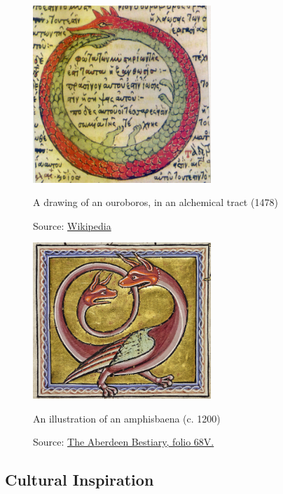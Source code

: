 \begin{uomappendix}
                \begin{figure}[h]
                    \centering
                    \includegraphics[width=0.6\textwidth]{images/Ouroborus.jpg}
                    \caption{A drawing of an ouroboros, in an alchemical tract (1478)}
                    \label{fig:ouroboros}
                    \caption*{Source: \href{https://en.wikipedia.org/wiki/File:Serpiente_alquimica.jpg}{Wikipedia}}
                \end{figure}
    
                \begin{figure}[H]
                    \centering
                    \includegraphics[width=0.6\textwidth]{images/Amphisbaena.png}
                    \caption{An illustration of an amphisbaena (c. 1200)}
                    \label{fig:amphisbaena}
                    \caption*{Source: \href{https://www.abdn.ac.uk/bestiary/ms24/f68v}{The Aberdeen Bestiary, folio 68V.}}
                \end{figure}
    
            \subsection{Cultural Inspiration} \label{app:Cult}
    

\end{uomappendix}
